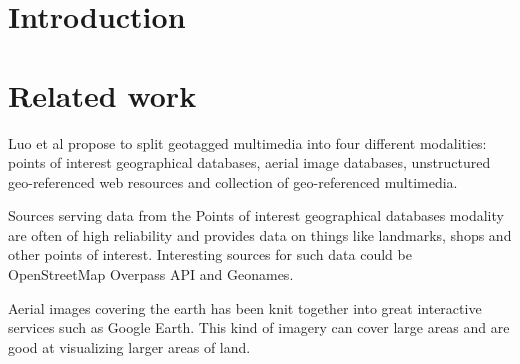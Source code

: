 \documentclass[journal]{IEEEtran}
\begin{document}
%


\section{Introduction}

\section{Related work}
Luo et al\cite{geotagging-survey} propose to split geotagged multimedia into four different modalities: points of interest geographical databases, aerial image databases, unstructured geo-referenced web resources and collection of geo-referenced multimedia. 

Sources serving data from the Points of interest geographical databases modality are often of high reliability and provides data on things like landmarks, shops and other points of interest. Interesting sources for such data could be OpenStreetMap Overpass API\cite{overpass} and Geonames\cite{geonames}. 

Aerial images covering the earth has been knit together into great interactive services such as Google Earth\cite{google-earth}. This kind of imagery can cover large areas and are good at visualizing larger areas of land. 
\end{document}
